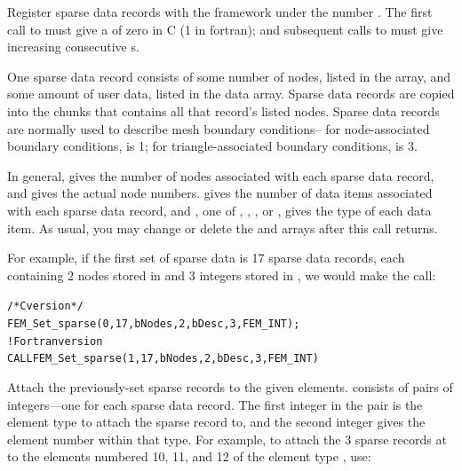 
Register  sparse data records with the framework under the number . 
The first call to  must give a  of zero in C (1 in fortran);
and subsequent calls to  must give increasing consecutive s.

One sparse data record consists of some number of nodes, listed in the
 array, and some amount of user data, listed in the data array.
Sparse data records are copied into the chunks that contains all that record's listed 
nodes.  Sparse data records are normally used to describe mesh boundary conditions--
for node-associated boundary conditions,  is 1; for triangle-associated
boundary conditions,  is 3.

In general,  gives the number of nodes associated with each
sparse data record, and  gives the actual node numbers.
 gives the number of data items associated with each sparse 
data record, and , one of , ,
, or , gives the type of each data item.
As usual, you may change or delete the  and  arrays after 
this call returns.

For example, if the first set of sparse data is 17 sparse data records, each 
containing 2 nodes stored in  and 3 integers stored in , 
we would make the call:
\begin{alltt}
/*C version*/
  FEM\_Set\_sparse(0,17, bNodes,2, bDesc,3,FEM\_INT);
! Fortran version
  CALL FEM\_Set\_sparse(1,17, bNodes,2, bDesc,3,FEM\_INT)
\end{alltt}


Attach the previously-set sparse records  to the given elements.
 consists of pairs of integers---one for each sparse data record.
The first integer in the pair is the
element type to attach the sparse record to, and the second integer
gives the element number within that type.  For example, to attach
the 3 sparse records at  to the elements numbered 10, 11, and 12
of the element type , use:

